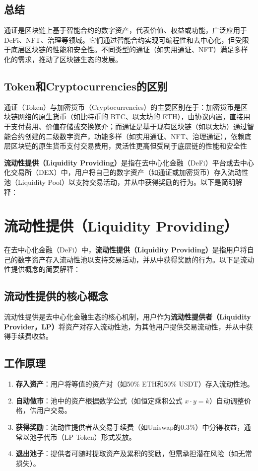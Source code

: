 \documentclass[12pt]{ctexart}
\begin{document}
\subsection{总结}
通证是区块链上基于智能合约的数字资产，代表价值、权益或功能，广泛应用于 DeFi、NFT、治理等领域。它们通过智能合约实现可编程性和去中心化，但受限于底层区块链的性能和安全性。不同类型的通证（如实用通证、NFT）满足多样化的需求，推动了区块链生态的发展。

\subsection{Token和Cryptocurrencies的区别}
通证（Token）与加密货币（Cryptocurrencies）的主要区别在于：加密货币是区块链网络的原生货币（如比特币的 BTC、以太坊的 ETH），由协议内置，直接用于支付费用、价值存储或交换媒介；而通证是基于现有区块链（如以太坊）通过智能合约创建的二级数字资产，功能多样（如实用通证、NFT、治理通证），依赖底层区块链的原生货币支付交易费用，灵活性更高但受制于底层链的性能和安全性

\textbf{流动性提供（Liquidity Providing）}是指在去中心化金融（DeFi）平台或去中心化交易所（DEX）中，用户将自己的数字资产（如通证或加密货币）存入流动性池（Liquidity Pool）以支持交易活动，并从中获得奖励的行为。以下是简明解释：

\newpage
\section{流动性提供（Liquidity Providing）}
在去中心化金融（DeFi）中，\textbf{流动性提供（Liquidity Providing）}是指用户将自己的数字资产存入流动性池以支持交易活动，并从中获得奖励的行为。以下是流动性提供概念的简要解释：

\subsection{流动性提供的核心概念}
流动性提供是去中心化金融生态的核心机制，用户作为\textbf{流动性提供者（Liquidity Provider，LP）}将资产对存入流动性池，为其他用户提供交易流动性，并从中获得手续费收益。

\subsection{工作原理}
\begin{enumerate}
  \item \textbf{存入资产}：用户将等值的资产对（如50\% ETH和50\% USDT）存入流动性池。
  \item \textbf{自动做市}：池中的资产根据数学公式（如恒定乘积公式 $x \cdot y = k$）自动调整价格，供用户交易。
  \item \textbf{获得奖励}：流动性提供者从交易手续费（如Uniswap的0.3\%）中分得收益，通常以池子代币（LP Token）形式发放。
  \item \textbf{退出池子}：提供者可随时提取资产及累积的奖励，但需承担潜在风险（如无常损失）。
\end{enumerate}
\end{document}

